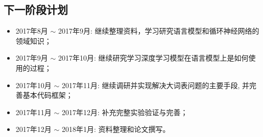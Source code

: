 \documentclass[twoside,UTF8,AutoFakeBold]{buaathesis}
\begin{document}
\subsection{下一阶段计划}
\begin{itemize}
  \item 2017年8月 $\sim$ 2017年9月: 继续整理资料，学习研究语言模型和循环神经网络的领域知识；
  \item 2017年9月 $\sim$ 2017年10月: 继续研究学习深度学习模型在语言模型上是如何使用的过程；
  \item 2017年10月 $\sim$ 2017年11月: 继续调研并实现解决大词表问题的主要手段, 并完善基本代码框架；
  \item 2017年11月 $\sim$ 2017年12月: 补充完整实验验证与完善；
  \item 2017年12月 $\sim$ 2018年1月: 资料整理和论文撰写。
\end{itemize}






\newpage
{}
\end{document}
